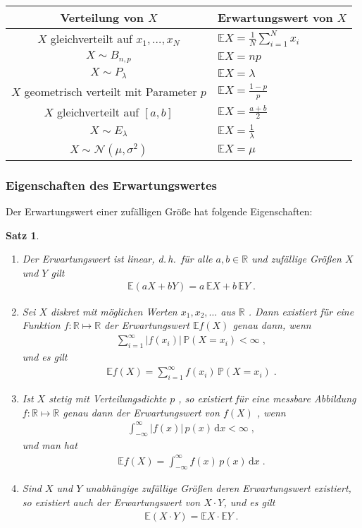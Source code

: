 \documentclass[ngerman,draft,parskip=half,twoside]{scrartcl}
\newtheorem{thm}{Satz}[section]
\newcommand*{\R}{\mathbb{R}}      %
\newcommand*{\E}{\mathbb{E}}        %
\newcommand*{\WKM}{\mathbb{P}}      %
\begin{document}
{\renewcommand{\arraystretch}{1.4}
\begin{center}
\begin{tabular}{|c|l|}\hline
\bf Verteilung von $X$& \bf Erwartungswert von $X$\\ \hline\hline
$X$ gleichverteilt auf $x_1,\ldots,x_N$& $\E X=\frac{1}{N}\sum_{i=1}^N x_i$\\ \hline
$X\sim B_{n,p}$& $\E X= n p$\\ \hline
$X\sim P_\lambda$&$\E X= \lambda$\\ \hline
$X$ geometrisch verteilt mit Parameter $p$& $\E X = \frac{1-p}{p}$\\ \hline
$X$ gleichverteilt auf $[a,b]$& $\E X= \frac{a+b}{2}$\\ \hline
$X\sim E_\lambda$& $\E X = \frac{1}{\lambda}$\\ \hline
$X\sim \mathcal N(\mu,\sigma^2)$&$ \E X = \mu$\\ \hline
\end{tabular}
\end{center}
}
\subsubsection{Eigenschaften des Erwartungswertes}
Der Erwartungswert einer zufälligen Größe hat folgende Eigenschaften:
\begin{thm}~
\begin{enumerate}
\item
Der Erwartungswert ist linear, d.\,h.~für alle $a,b\in\R$ und zufällige Größen $X$ und $Y$
gilt
  \begin{gather*}
    \E(a X+ b Y) = a\,\E X + b\, \E Y\;.
  \end{gather*}
\item
Sei  $X$ diskret mit möglichen Werten $x_1,x_2,\ldots$ aus $\R$ .
Dann existiert für eine Funktion $f \colon\R\mapsto\R$
der Erwartungswert $\E f(X)$ genau dann, wenn
  \begin{gather*}
    \sum_{i=1}^\infty |f(x_i)|\,\WKM(X=x_i)<\infty\;,
  \end{gather*}
und es gilt
  \begin{gather*}
    \E f(X)=\sum_{i=1}^\infty f(x_i)\,\WKM(X=x_i)\;.
  \end{gather*}
\item
Ist $X$ stetig mit Verteilungsdichte $p$ , so existiert für eine messbare
Abbildung $f \colon\R\mapsto\R$ genau dann der Erwartungswert von $f(X)$ , wenn
  \begin{gather*}
    \int_{-\infty}^\infty |f(x)|\,p(x)\,\mathrm d x<\infty\;,
  \end{gather*}
und man hat
  \begin{gather*}
    \E f(X)=\int_{-\infty}^\infty  f(x) \,p(x)\,\mathrm d x\;.
  \end{gather*}
\item
Sind $X$ und $Y$ unabhängige zufällige Größen deren Erwartungswert existiert,
so existiert auch der Erwartungswert von $X\cdot Y$, und es gilt
  \begin{gather*}
    \E(X\cdot Y)= \E X \cdot \E Y\;.
  \end{gather*}
\end{enumerate}
\end{thm}
\end{document}
